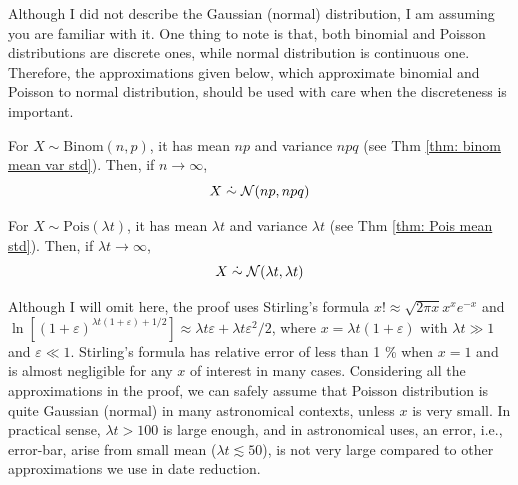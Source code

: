 Although I did not describe the Gaussian (normal) distribution, I am assuming you are familiar with it. One thing to note is that, both binomial and Poisson distributions are discrete ones, while normal distribution is continuous one. Therefore, the approximations given below, which approximate binomial and Poisson to normal distribution, should be used with care when the discreteness is important.

\begin{thm} \label{thm: binom to normal}
For $ X \sim \mathrm{Binom}(n, p) $, it has mean $ np $ and variance $ npq $ (see Thm \ref{thm: binom mean var std}). Then, if $ n \rightarrow \infty $,
  \begin{equation}\label{eq: binom to normal}
    X \mathrel{\dot{\sim}} \mathcal{N}(np, npq)
  \end{equation}
\end{thm}

\begin{thm}  \label{thm: pois to normal}
For $ X \sim \mathrm{Pois}(\lambda t) $, it has mean $ \lambda t $ and variance $ \lambda t $ (see Thm \ref{thm: Pois mean std}). Then, if $ \lambda t \rightarrow \infty $,
  \begin{equation}\label{eq: pois to normal}
    X \mathrel{\dot{\sim}} \mathcal{N}(\lambda t, \lambda t)
  \end{equation}
\end{thm}
Although I will omit here, the proof uses Stirling's formula $ x! \approx \sqrt{2\pi x} x^x e^{-x} $ and $ \ln[ (1 + \varepsilon)^{\lambda t (1 + \varepsilon) + 1 / 2 }] \approx \lambda t \varepsilon + \lambda t \varepsilon^2 / 2 $, where $ x = \lambda t ( 1 + \varepsilon ) $ with $ \lambda t \gg 1 $ and $ \varepsilon \ll 1 $. Stirling's formula has relative error of less than 1 \% when $ x = 1 $ and is almost negligible for any $ x $ of interest in many cases. Considering all the approximations in the proof, we can safely assume that Poisson distribution is quite Gaussian (normal) in many astronomical contexts, unless $ x $ is very small. In practical sense, $ \lambda t > 100 $ is large enough, and in astronomical uses, an error, i.e., error-bar, arise from small mean ($ \lambda t \lesssim 50 $), is not very large compared to other approximations we use in date reduction.


